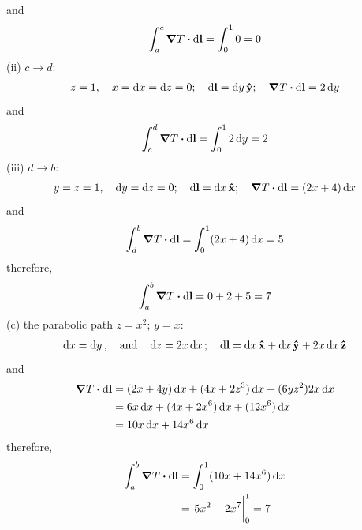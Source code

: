 \documentclass[../main.tex]{subfiles}
\begin{document}
and
\begin{align*}
    \int_a^c \grad{T} \vdot \dd{\vb{l}} = \int_0^1 0 = 0
\end{align*}
(ii) $c \to d$:
\begin{align*}
    z = 1, \quad x = \dd{x} = \dd{z} = 0; \quad \dd{\vb{l}} = \dd{y} \vu{y};
        \quad \grad{T} \vdot \dd{\vb{l}} = 2 \dd{y}
\end{align*}
and
\begin{align*}
    \int_c^d \grad{T} \vdot \dd{\vb{l}} = \int_0^1 2 \dd{y} = 2
\end{align*}
(iii) $d \to b$:
\begin{align*}
    y = z = 1, \quad \dd{y} = \dd{z} = 0; \quad \dd{\vb{l}} = \dd{x} \vu{x};
        \quad \grad{T} \vdot \dd{\vb{l}} = (2x+4) \dd{x}
\end{align*}
and
\begin{align*}
    \int_d^b \grad{T} \vdot \dd{\vb{l}} = \int_0^1 (2x+4) \dd{x} = 5
\end{align*}
therefore,
\begin{align*}
    \int_a^b \grad{T} \vdot \dd{\vb{l}} = 0 + 2 + 5 = 7
\end{align*}
(c) the parabolic path $z = x^2$; $y = x$:
\begin{align*}
    \dd{x} = \dd{y}, \qand \dd{z} = 2x \dd{x}; \quad
    \dd{\vb{l}} = \dd{x} \vu{x} + \dd{x} \vu{y} + 2x\dd{x} \vu{z}
\end{align*}
and
\begin{align*}
    \grad{T} \vdot \dd{\vb{l}} &= (2x+4y) \dd{x} + (4x+2z^3) \dd{x} + (6yz^2) 2x\dd{x} \\
    &= 6x \dd{x} + (4x + 2x^6) \dd{x} + (12x^6) \dd{x} \\
    &= 10x \dd{x} + 14x^6 \dd{x}
\end{align*}
therefore,
\begin{align*}
    \int_a^b \grad{T} \vdot \dd{\vb{l}} &= \int_0^1 (10x + 14x^6) \dd{x} \\
    &= \eval{5x^2 + 2x^7}_0^1 = 7
\end{align*}
\end{document}
